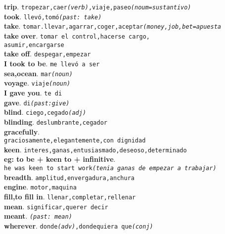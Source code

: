 \documentclass[twocolumn]{article}
\begin{document}
	\textsf{\textbf{trip}}. \texttt{tropezar,caer{\scriptsize \textsl{(verb)}},viaje,paseo{\scriptsize \textsl{(noum=sustantivo)}}}\\
	\textsf{\textbf{took}}. \texttt{llev\'o,tom\'o{\scriptsize \textsl{(past: take)}}}\\
	\textsf{\textbf{take}}. \texttt{tomar.llevar,agarrar,coger,aceptar{\scriptsize \textsl{(money,job,bet=apuesta}}}\\
	\textsf{\textbf{take over}}. \texttt{tomar el control,hacerse cargo,\\asumir,encargarse}\\
	\textsf{\textbf{take off}}. \texttt{despegar,empezar}\\
	\textsf{\textbf{I took to be}}. \texttt{me llev\'o a ser}\\
	\textsf{\textbf{sea,ocean}}. \texttt{mar{\scriptsize \textsl{(noun)}}}\\
	\textsf{\textbf{voyage}}. \texttt{viaje{\scriptsize \textsl{(noun)}}}\\
	\textsf{\textbf{I gave you}}. \texttt{te di}\\
	\textsf{\textbf{gave}}. \texttt{di{\scriptsize \textsl{(past:give)}}}\\
	\textsf{\textbf{blind}}. \texttt{ciego,cegado{\scriptsize \textsl{(adj)}}}\\
	\textsf{\textbf{blinding}}. \texttt{deslumbrante,cegador}\\
	\textsf{\textbf{gracefully}}.\\\texttt{graciosamente,elegantemente,con dignidad}\\
	\textsf{\textbf{keen}}. \texttt{interes,ganas,entusiasmado,deseoso,determinado}\\
	{\scriptsize \textsf{\textbf{eg: to be + keen to + infinitive}}.\\
	\texttt{he was keen to start work{\scriptsize \textsl{(tenia ganas de empezar a trabajar)}}}}\\
	\textsf{\textbf{breadth}}. \texttt{amplitud,envergadura,anchura}\\
	\textsf{\textbf{engine}}. \texttt{motor,maquina}\\
	\textsf{\textbf{fill,to fill in}}. \texttt{llenar,completar,rellenar}\\
	\textsf{\textbf{mean}}. \texttt{significar,querer decir}\\
	\textsf{\textbf{meant}}. \texttt{{\scriptsize \textsl{(past: mean)}}}\\
	\textsf{\textbf{wherever}}. \texttt{donde{\scriptsize \textsl{(adv)}},dondequiera que{\scriptsize \textsl{(conj)}}}\\
\end{document}
